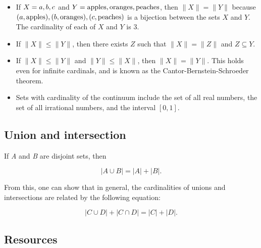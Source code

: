 \begin{itemize}
    \item If $X = \\{a, b, c\\}$ and $Y = \\{\text{apples}, \text{oranges}, \text{peaches}\\}$, then $\|X\| = \|Y\|$ because $\\{(a, \text{apples}), (b, \text{oranges}), (c, \text{peaches})\\}$ is a bijection between the sets $X$ and $Y$. The cardinality of each of $X$ and $Y$ is 3.
    \item If $\|X\| \leq \|Y\|$, then there exists $Z$ such that $\|X\| = \|Z\|$ and $Z \subseteq Y$.
    \item If $\|X\| \leq \|Y\|$ and $\|Y\| \leq \|X\|$, then $\|X\| = \|Y\|$. This holds even for infinite cardinals, and is known as the Cantor-Bernstein-Schroeder theorem.
    \item Sets with cardinality of the continuum include the set of all real numbers, the set of all irrational numbers, and the interval $[0, 1]$.
\end{itemize}


\subsection{Union and intersection}
\label{sss:unio-f5e3}




If \textit{A} and \textit{B} are disjoint sets, then



$$\left\vert A \cup B \right\vert = \left\vert A \right\vert + \left\vert B \right\vert.$$



From this, one can show that in general, the cardinalities of unions and intersections are
related by the following equation:



$$\left\vert C \cup D \right\vert + \left\vert C \cap D \right\vert = \left\vert C \right\vert + \left\vert D \right\vert.$$




\subsection{Resources}
\label{sss:reso-55b5}




